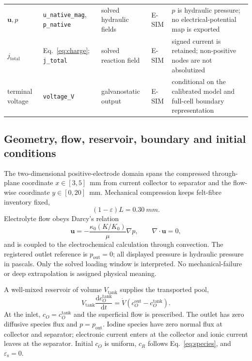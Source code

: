 \documentclass[11pt]{article}
\let\SIorigsubsection\subsection
\renewcommand{\subsection}{\FloatBarrier\SIorigsubsection}
\newcommand{\epss}{\varepsilon_{\mathrm{s}}}
\begin{document}
\begin{table}[!htbp]
\begin{tabularx}{\textwidth}{@{}P{2.25cm}P{2.55cm}P{2.15cm}P{1.25cm}Y@{}}
$\mathbf{u},p$ & \texttt{u\_native\_mag}, \texttt{p\_native} & solved hydraulic fields & E-SIM & $p$ is hydraulic pressure; no electrical-potential map is exported\\
$j_{\mathrm{total}}$ & Eq.~\eqref{eq:charge}; \texttt{j\_total} & solved reaction field & E-SIM & signed current is retained; non-positive nodes are not absolutized\\
terminal voltage & \texttt{voltage\_V} & galvanostatic output & E-SIM & conditional on the calibrated model and full-cell boundary representation\\
\bottomrule
\end{tabularx}
\end{table}

\subsection{Geometry, flow, reservoir, boundary and initial conditions}

The two-dimensional positive-electrode domain spans the compressed through-plane coordinate
$x\in[3,5]$~mm from current collector to separator and the flow-wise coordinate $y\in[0,20]$~mm. Mechanical
compression keeps felt-fibre inventory fixed,
\begin{equation}
(1-\varepsilon)L=\SI{0.30}{mm}.
\label{eq:compression-rule}
\end{equation}
Electrolyte flow obeys Darcy's relation
\begin{equation}
\mathbf{u}=-\frac{\kappa_0(K/K_0)}{\mu}\nabla p,
\qquad \nabla\!\cdot\mathbf{u}=0,
\label{eq:darcy}
\end{equation}
and is coupled to the electrochemical calculation through convection. The registered outlet reference is
$p_{\mathrm{out}}=0$; all displayed pressure is hydraulic pressure in pascals. Only the solved loading window
is interpreted. No mechanical-failure or deep extrapolation is assigned physical meaning.

A well-mixed reservoir of volume $V_{\mathrm{tank}}$ supplies the transported pool,
\begin{equation}
V_{\mathrm{tank}}\frac{\mathrm dc_O^{\mathrm{tank}}}{\mathrm dt}
=\dot V(c_O^{\mathrm{out}}-c_O^{\mathrm{tank}}).
\label{eq:tank}
\end{equation}
At the inlet, $c_O=c_O^{\mathrm{tank}}$ and the superficial flow is prescribed. The outlet has zero diffusive
species flux and $p=p_{\mathrm{out}}$. Iodine species have zero normal flux at collector and separator;
electronic current enters at the collector and ionic current leaves at the separator. Initial $c_O$ is uniform,
$c_R$ follows Eq.~\eqref{eq:species}, and $\epss=0$.
\end{document}
